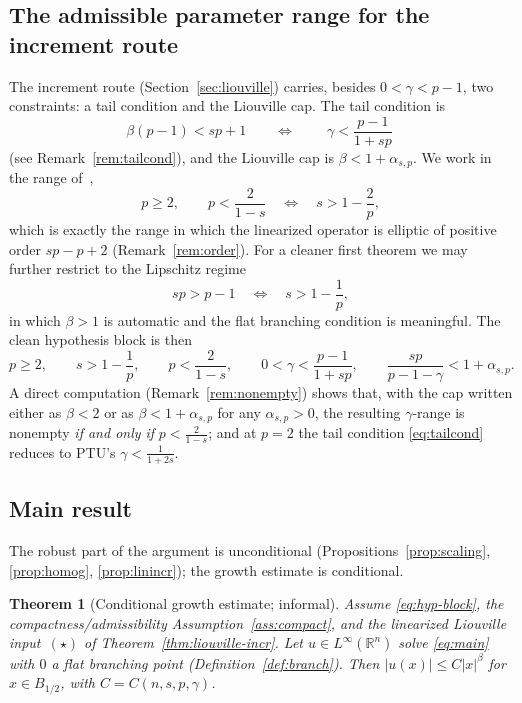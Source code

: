\documentclass[11pt]{amsart}
\theoremstyle{plain}
\newtheorem{theorem}{Theorem}[section]
\theoremstyle{definition}
\theoremstyle{remark}
\newcommand{\R}{\mathbb{R}}
\newcommand{\asp}{\alpha_{s,p}}
\begin{document}
\subsection{The admissible parameter range for the increment route}
The increment route (Section~\ref{sec:liouville}) carries, besides $0<\gamma<p-1$,
two constraints: a tail condition and the Liouville cap. The tail condition is
\begin{equation}\label{eq:tailcond}
  \beta(p-1)<sp+1
  \qquad\Longleftrightarrow\qquad
  \boxed{\ \gamma<\frac{p-1}{1+sp}\ }
\end{equation}
(see Remark~\ref{rem:tailcond}), and the Liouville cap is $\beta<1+\asp$. We
work in the range of~\cite{GJS},
\begin{equation}\label{eq:gjs-range}
  p\ge2,\qquad p<\frac{2}{1-s}\quad\Longleftrightarrow\quad s>1-\frac2p,
\end{equation}
which is exactly the range in which the linearized operator is elliptic of
positive order $sp-p+2$ (Remark~\ref{rem:order}). For a cleaner first theorem
we may further restrict to the Lipschitz regime
\begin{equation}\label{eq:lip-range}
  sp>p-1\quad\Longleftrightarrow\quad s>1-\frac1p,
\end{equation}
in which $\beta>1$ is automatic and the flat branching condition is
meaningful. The clean hypothesis block is then
\begin{equation}\label{eq:hyp-block}
  p\ge2,\qquad s>1-\frac1p,\qquad p<\frac{2}{1-s},\qquad
  0<\gamma<\frac{p-1}{1+sp},\qquad \frac{sp}{p-1-\gamma}<1+\asp .
\end{equation}
A direct computation (Remark~\ref{rem:nonempty}) shows that, with the cap
written either as $\beta<2$ or as $\beta<1+\asp$ for any $\asp>0$, the
resulting $\gamma$-range is nonempty \emph{if and only if} $p<\frac2{1-s}$; and
at $p=2$ the tail condition \eqref{eq:tailcond} reduces to PTU's
$\gamma<\frac1{1+2s}$.

\subsection{Main result}
The robust part of the argument is unconditional
(Propositions~\ref{prop:scaling}, \ref{prop:homog}, \ref{prop:linincr}); the
growth estimate is conditional.

\begin{theorem}[Conditional growth estimate; informal]\label{thm:main-intro}
Assume \eqref{eq:hyp-block}, the compactness/admissibility
Assumption~\ref{ass:compact}, and the linearized Liouville
input~$(\star)$ of Theorem~\ref{thm:liouville-incr}. Let $u\in L^\infty(\R^n)$
solve \eqref{eq:main} with $0$ a flat branching point
(Definition~\ref{def:branch}). Then $|u(x)|\le C|x|^{\beta}$ for $x\in B_{1/2}$,
with $C=C(n,s,p,\gamma)$.
\end{theorem}
\end{document}
